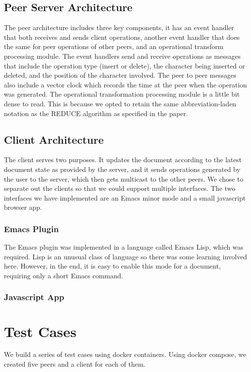 \documentclass{article}
\begin{document}
\subsection{Peer Server Architecture}
The peer architecture includes three key components, it has an event handler that both receives and sends client operations, another event handler that does the same for peer operations of other peers, and an operational transform processing module. The event handlers send and receive operations as messages that include the operation type (insert or delete), the character being inserted or deleted, and the position of the character involved. The peer to peer messages also include a vector clock which records the time at the peer when the operation was generated. The operational transformation processing module is a little bit dense to read. This is because we opted to retain the same abbreviation-laden notation as the REDUCE algorithm as specified in the paper.\\

\subsection{Client Architecture}
The client serves two purposes. It updates the document according to the latest document state as provided by the server, and it sends operations generated by the user to the server, which then gets multicast to the other peers. We chose to separate out the clients so that we could support multiple interfaces. The two interfaces we have implemented are an Emacs minor mode and a small javascript browser app.\\

\subsubsection{Emacs Plugin}
The Emacs plugin was implemented in a language called Emacs Lisp, which was required. Lisp is an unusual class of language so there was some learning involved here. However, in the end, it is easy to enable this mode for a document, requiring only a short Emacs command.

\subsubsection{Javascript App}

\section{Test Cases}
We build a series of test cases using docker containers. Using docker compose, we created five peers and a client for each of them.
\end{document}
